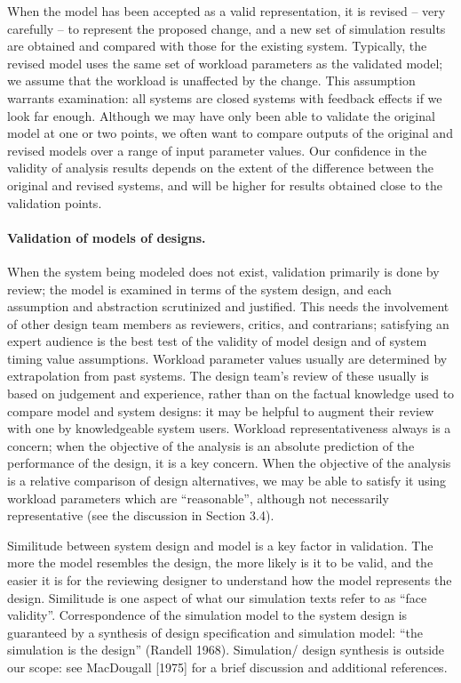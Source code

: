 When the model has been accepted as a valid representation, it is revised --
very carefully -- to represent the proposed change, and a new set of
simulation results are obtained and compared with those for the existing
system. Typically, the revised model uses the same set of workload parameters
as the validated model; we assume that the workload is unaffected by the
change. This assumption warrants examination: all systems are closed systems
with feedback effects if we look far enough. Although we may have only been
able to validate the original model at one or two points, we often want to
compare outputs of the original and revised models over a range of input
parameter values. Our confidence in the validity of analysis results depends
on the extent of the difference between the original and revised systems, and
will be higher for results obtained close to the validation points.

\paragraph{Validation of models of designs.}
When the system being modeled does not exist, validation primarily is done by
review; the model is examined in terms of the system design, and each
assumption and abstraction scrutinized and justified. This needs the
involvement of other design team members as reviewers, critics, and
contrarians; satisfying an expert audience is the best test of the validity of
model design and of system timing value assumptions. Workload parameter values
usually are determined by extrapolation from past systems. The design team's
review of these usually is based on judgement and experience, rather than on
the factual knowledge used to compare model and system designs: it may be
helpful to augment their review with one by knowledgeable system users.
Workload representativeness always is a concern; when the objective of the
analysis is an absolute prediction of the performance of the design, it is a
 key concern. When the objective of the analysis is a relative comparison of
design alternatives, we may be able to satisfy it using workload parameters
which are ``reasonable'', although not necessarily representative (see the
discussion in Section 3.4).

Similitude between system design and model is a key factor in validation. The
more the model resembles the design, the more likely is it to be valid, and
the easier it is for the reviewing designer to understand how the model
represents the design. Similitude is one aspect of what our simulation texts
refer to as ``face validity''. Correspondence of the simulation model to the
system design is guaranteed by a synthesis of design specification and
simulation model: ``the simulation is the design'' (Randell 1968). Simulation/
design synthesis is outside our scope: see MacDougall [1975] for a brief
discussion and additional references.


